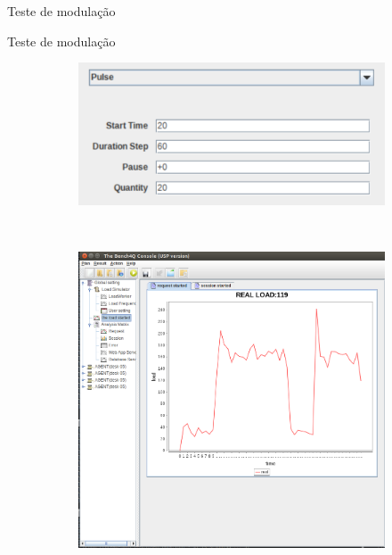 \begin{frame}{Teste de modulação}

\end{frame}

\begin{frame}{Teste de modulação}
	\begin{figure}[!htb]		
		\begin{subfigure}{\linewidth}
			\centering
			\includegraphics[scale=0.35]{../monograph/images/condiguracao-carga-modulada1.png}
			\label{fig:configuracao-carga-modulada-teste}
		\end{subfigure}\\[1ex]
		\begin{subfigure}{\linewidth}
			\centering
			\includegraphics[scale=0.25]{../monograph/images/grafico-carga-modulada-teste.png}
			\label{fig:grafico-carga-modulada-teste}
		\end{subfigure}
		\label{fig:carga-modulada-teste}
	\end{figure}
\end{frame}

